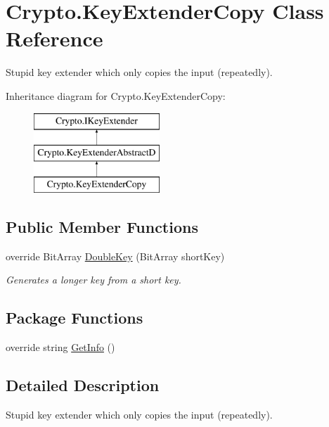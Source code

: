 \hypertarget{class_crypto_1_1_key_extender_copy}{}\section{Crypto.\+Key\+Extender\+Copy Class Reference}
\label{class_crypto_1_1_key_extender_copy}


Stupid key extender which only copies the input (repeatedly).  


Inheritance diagram for Crypto.\+Key\+Extender\+Copy\+:\begin{figure}[H]
\begin{center}
\leavevmode
\includegraphics[height=3.000000cm]{class_crypto_1_1_key_extender_copy}
\end{center}
\end{figure}
\subsection*{Public Member Functions}
\begin{DoxyCompactItemize}
\item 
override Bit\+Array \hyperlink{class_crypto_1_1_key_extender_copy_ab57d10f5c80bbf6ab395e0a0b690080a}{Double\+Key} (Bit\+Array short\+Key)
\begin{DoxyCompactList}\small\item\em Generates a longer key from a short key. \end{DoxyCompactList}\end{DoxyCompactItemize}
\subsection*{Package Functions}
\begin{DoxyCompactItemize}
\item 
override string \hyperlink{class_crypto_1_1_key_extender_copy_ab6904bc5e3596cb7ac2cd7840cf356ef}{Get\+Info} ()
\end{DoxyCompactItemize}


\subsection{Detailed Description}
Stupid key extender which only copies the input (repeatedly). 




